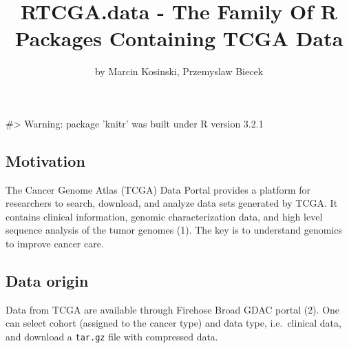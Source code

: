 \title{RTCGA.data - The Family Of R Packages Containing TCGA Data}
\author{by Marcin Kosinski, Przemyslaw Biecek}

\maketitle


\begin{Schunk}
\begin{Soutput}
#> Warning: package 'knitr' was built under R version 3.2.1
\end{Soutput}
\end{Schunk}

\subsection{Motivation}\label{motivation}

The Cancer Genome Atlas (TCGA) Data Portal provides a platform for
researchers to search, download, and analyze data sets generated by
TCGA. It contains clinical information, genomic characterization data,
and high level sequence analysis of the tumor genomes (1). The key is to
understand genomics to improve cancer care.

\subsection{Data origin}\label{data-origin}

Data from TCGA are available through Firehose Broad GDAC portal (2). One
can select cohort (assigned to the cancer type) and data type,
i.e.~clinical data, and download a \texttt{tar.gz} file with compressed
data.

